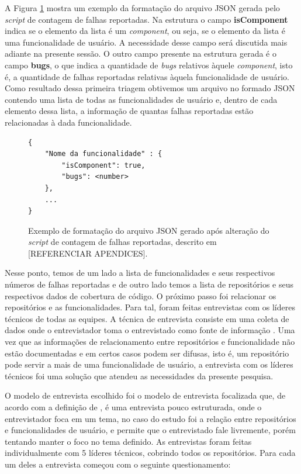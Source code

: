 \documentclass[11.5pt]{article}
\begin{document}
A Figura \ref{fig:formatoJsonBugs} mostra um exemplo da formatação do arquivo JSON gerada pelo
\textit{script} de contagem de falhas reportadas.
Na estrutura o campo \textbf{isComponent} indica se o elemento da lista é um \textit{component},
ou seja, se o elemento da lista é uma funcionalidade de usuário.
A necessidade desse campo será discutida mais adiante na presente sessão.
O outro campo presente na estrutura gerada é o campo \textbf{bugs}, o que indica a quantidade de
\textit{bugs} relativos àquele \textit{component}, isto é, a quantidade de falhas reportadas
relativas àquela funcionalidade de usuário.
Como resultado dessa primeira triagem obtivemos um arquivo no formado JSON contendo uma lista de
todas as funcionalidades de usuário e, dentro de cada elemento dessa lista, a informação de quantas
falhas reportadas estão relacionadas à dada funcionalidade.

\begin{figure}[ht]
\caption{Exemplo de formatação do arquivo JSON gerado após alteração do \textit{script} de contagem
de falhas reportadas, descrito em [REFERENCIAR APENDICES].}
\label{fig:formatoJsonBugs}
\begin{verbatim}
{
    "Nome da funcionalidade" : {
        "isComponent": true,
        "bugs": <number>
    },
    ...
}
\end{verbatim}
\end{figure}

Nesse ponto, temos de um lado a lista de funcionalidades e seus respectivos números de falhas
reportadas e de outro lado temos a lista de repositórios e seus respectivos dados de cobertura
de código.
O próximo passo foi relacionar os repositórios e as funcionalidades.
Para tal, foram feitas entrevistas com os líderes técnicos de todas as equipes.
A técnica de entrevista consiste em uma coleta de dados onde o entrevistador toma o entrevistado
como fonte de informação \cite{metodosPesquisaSocial}.
Uma vez que as informações de relacionamento entre repositórios e funcionalidade não estão
documentadas e em certos casos podem ser difusas, isto é, um repositório pode servir a mais de uma
funcionalidade de usuário, a entrevista com os líderes técnicos foi uma solução que atendeu as
necessidades da presente pesquisa.

O modelo de entrevista escolhido foi o modelo de entrevista focalizada que, de acordo com a
definição de \cite{metodosPesquisaSocial}, é uma entrevista pouco estruturada, onde o entrevistador
foca em um tema, no caso do estudo foi a relação entre repositórios e funcionalidades de usuário,
e permite que o entrevistado fale livremente, porém tentando manter o foco no tema definido.
As entrevistas foram feitas individualmente com 5 líderes técnicos, cobrindo todos os repositórios.
Para cada um deles a entrevista começou com o seguinte questionamento:
\end{document}
